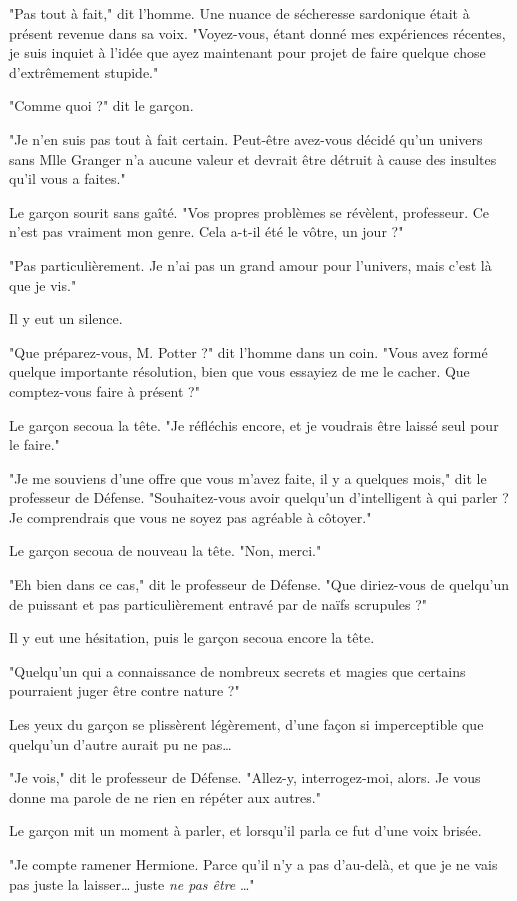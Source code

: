 "Pas tout à fait," dit l'homme. Une nuance de sécheresse sardonique était à présent revenue dans sa voix. "Voyez-vous, étant donné mes expériences récentes, je suis inquiet à l'idée que ayez maintenant pour projet de faire quelque chose d'extrêmement stupide."

"Comme quoi ?" dit le garçon.

"Je n'en suis pas tout à fait certain. Peut-être avez-vous décidé qu'un univers sans Mlle Granger n'a aucune valeur et devrait être détruit à cause des insultes qu'il vous a faites."

Le garçon sourit sans gaîté. "Vos propres problèmes se révèlent, professeur. Ce n'est pas vraiment mon genre. Cela a-t-il été le vôtre, un jour ?"

"Pas particulièrement. Je n'ai pas un grand amour pour l'univers, mais c'est là que je vis."

Il y eut un silence.

"Que préparez-vous, M. Potter ?" dit l'homme dans un coin. "Vous avez formé quelque importante résolution, bien que vous essayiez de me le cacher. Que comptez-vous faire à présent ?"

Le garçon secoua la tête. "Je réfléchis encore, et je voudrais être laissé seul pour le faire."

"Je me souviens d'une offre que vous m'avez faite, il y a quelques mois," dit le professeur de Défense. "Souhaitez-vous avoir quelqu'un d'intelligent à qui parler ? Je comprendrais que vous ne soyez pas agréable à côtoyer."

Le garçon secoua de nouveau la tête. "Non, merci."

"Eh bien dans ce cas," dit le professeur de Défense. "Que diriez-vous de quelqu'un de puissant et pas particulièrement entravé par de naïfs scrupules ?"

Il y eut une hésitation, puis le garçon secoua encore la tête.

"Quelqu'un qui a connaissance de nombreux secrets et magies que certains pourraient juger être contre nature ?"

Les yeux du garçon se plissèrent légèrement, d'une façon si imperceptible que quelqu'un d'autre aurait pu ne pas…

"Je vois," dit le professeur de Défense. "Allez-y, interrogez-moi, alors. Je vous donne ma parole de ne rien en répéter aux autres."

Le garçon mit un moment à parler, et lorsqu'il parla ce fut d'une voix brisée.

"Je compte ramener Hermione. Parce qu'il n'y a pas d'au-delà, et que je ne vais pas juste la laisser… juste \emph{ne pas être} …"


